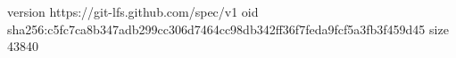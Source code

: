 version https://git-lfs.github.com/spec/v1
oid sha256:c5fc7ca8b347adb299cc306d7464cc98db342ff36f7feda9fcf5a3fb3f459d45
size 43840
